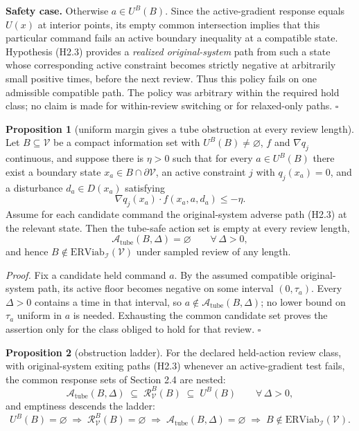 \documentclass[11pt]{article}
\theoremstyle{definition}
\newtheorem{proposition}{Proposition}
\begin{document}
\textbf{Safety case.} Otherwise \(a\in U^B(B)\). Since the active-gradient response equals \(U(x)\) at interior points, its empty common intersection implies that this particular command fails an active boundary inequality at a compatible state. Hypothesis (H2.3) provides a \emph{realized original-system} path from such a state whose corresponding active constraint becomes strictly negative at arbitrarily small positive times, before the next review. Thus this policy fails on one admissible compatible path. The policy was arbitrary within the required hold class; no claim is made for within-review switching or for relaxed-only paths. \ensuremath{\square}

\begin{proposition}[uniform margin gives a tube obstruction at every review length]\label{prop:uniform-margin}
Let \(B\subseteq\mathcal V\) be a compact information set with
\(U^B(B)\neq\varnothing\), \(f\) and \(\nabla q_j\) continuous, and
suppose there is \(\eta>0\) such that for every \(a\in U^B(B)\) there
exist a boundary state \(x_a\in B\cap\partial\mathcal V\), an active
constraint \(j\) with \(q_j(x_a)=0\), and a disturbance \(d_a\in D(x_a)\)
satisfying
\[\nabla q_j(x_a)\cdot f(x_a,a,d_a) \le -\eta.\]
Assume for each candidate command the original-system adverse path (H2.3) at the relevant state. Then the tube-safe action set is empty
at every review length,
\[\mathcal{A}_{\mathrm{tube}}(B,\Delta)=\varnothing \qquad \forall\,\Delta>0,\]
and hence \(B\notin\mathrm{ERViab}_{\mathcal I}(\mathcal V)\) under
sampled review of any length.
\end{proposition}

\emph{Proof.} Fix a candidate held command \(a\). By the assumed compatible original-system path, its active floor becomes negative on some interval \((0,\tau_a)\). Every \(\Delta>0\) contains a time in that interval, so \(a\notin\mathcal A_{\mathrm{tube}}(B,\Delta)\); no lower bound on \(\tau_a\) uniform in \(a\) is needed. Exhausting the common candidate set proves the assertion only for the class obliged to hold for that review. \ensuremath{\square}

\begin{proposition}[obstruction ladder]\label{prop:ladder}
For the declared held-action review class, with original-system exiting paths (H2.3) whenever an active-gradient test fails, the common response sets
of Section 2.4 are nested:
\[\mathcal{A}_{\mathrm{tube}}(B,\Delta) \;\subseteq\; \mathcal{R}_{\mathcal{V}}^B(B) \;\subseteq\; U^B(B) \qquad \forall\,\Delta>0,\]
and emptiness descends the ladder:
\[U^B(B)=\varnothing \;\Longrightarrow\; \mathcal{R}_{\mathcal{V}}^B(B)=\varnothing \;\Longrightarrow\; \mathcal{A}_{\mathrm{tube}}(B,\Delta)=\varnothing \;\Longrightarrow\; B\notin\mathrm{ERViab}_{\mathcal{I}}(\mathcal{V}).\]
\end{proposition}
\end{document}
